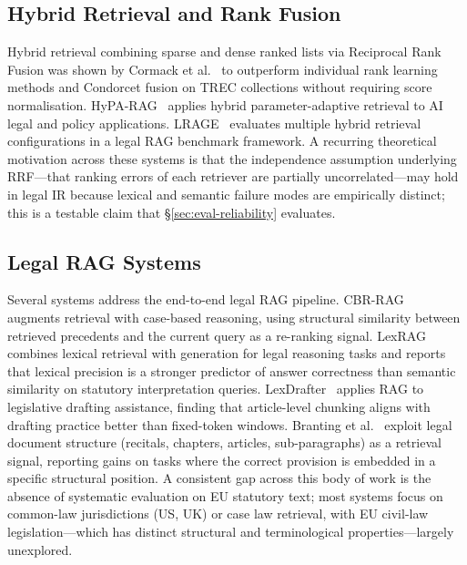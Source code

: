 \documentclass[sigconf,screen]{acmart}
\newcommand{\rrf}{RRF\xspace}
\begin{document}
\subsection{Hybrid Retrieval and Rank Fusion}
\label{sec:related-hybrid}

Hybrid retrieval combining sparse and dense ranked lists via
Reciprocal Rank Fusion was shown by Cormack et
al.~\cite{cormack2009rrf} to outperform individual rank learning
methods and Condorcet fusion on TREC collections without requiring
score normalisation.  HyPA-RAG~\cite{hyparag2024} applies hybrid
parameter-adaptive retrieval to AI legal and policy applications.
LRAGE~\cite{lrage2024} evaluates multiple hybrid retrieval
configurations in a legal RAG benchmark framework.  A recurring
theoretical motivation across these systems is that the independence
assumption underlying \rrf---that ranking errors of each retriever
are partially uncorrelated---may hold in legal IR because lexical and
semantic failure modes are empirically distinct; this is a testable
claim that \S\ref{sec:eval-reliability} evaluates.

\subsection{Legal RAG Systems}
\label{sec:related-legalrag}

Several systems address the end-to-end legal RAG pipeline.
CBR-RAG~\cite{cbrrag2023} augments retrieval with case-based
reasoning, using structural similarity between retrieved precedents
and the current query as a re-ranking signal.  LexRAG~\cite{lexrag2024}
combines lexical retrieval with generation for legal reasoning tasks
and reports that lexical precision is a stronger predictor of answer
correctness than semantic similarity on statutory interpretation
queries.  LexDrafter~\cite{lexdrafter2024} applies RAG to legislative
drafting assistance, finding that article-level chunking aligns with
drafting practice better than fixed-token windows.  Branting et
al.~\cite{legalstructurerag2024} exploit legal document structure
(recitals, chapters, articles, sub-paragraphs) as a retrieval signal,
reporting gains on tasks where the correct provision is embedded in a
specific structural position.  A consistent gap across this body of
work is the absence of systematic evaluation on EU statutory text;
most systems focus on common-law jurisdictions (US, UK) or case law
retrieval, with EU civil-law legislation---which has distinct
structural and terminological properties---largely unexplored.
\end{document}
